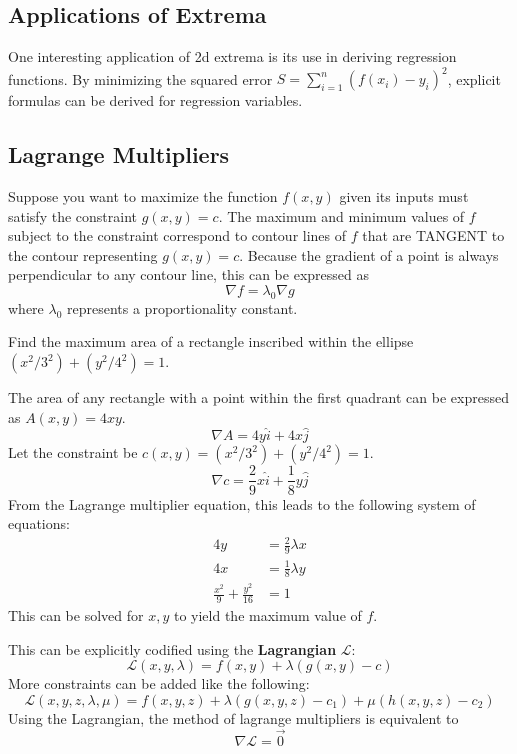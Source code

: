 \documentclass{article}
\begin{document}
\subsection{Applications of Extrema}
One interesting application of 2d extrema is its use in deriving regression functions.
By minimizing the squared error $S = \sum_{i=1}^{n} (f(x_i) - y_i)^2$, explicit formulas can be derived for regression variables.

\subsection{Lagrange Multipliers}
Suppose you want to maximize the function $f(x,y)$ given its inputs must satisfy the constraint $g(x,y) = c$.
The maximum and minimum values of $f$ subject to the constraint correspond to contour lines of $f$ that are TANGENT to the contour representing $g(x,y) = c$.
Because the gradient of a point is always perpendicular to any contour line, this can be expressed as
\[\nabla f = \lambda_0 \nabla g\]
where $\lambda_0$ represents a proportionality constant.

\begin{example}
    Find the maximum area of a rectangle inscribed within the ellipse $(x^2/3^2) + (y^2/4^2) = 1$.
\end{example}
\begin{answer}
    The area of any rectangle with a point within the first quadrant can be expressed as $A(x,y) = 4xy$.
    \[\nabla A = 4y\hat{i} + 4x \hat{j}\]
    Let the constraint be $c(x,y) = (x^2/3^2) + (y^2/4^2) = 1$.
    \[\nabla c = \frac{2}{9} x \hat{i} + \frac{1}{8} y \hat{j}\]
    From the Lagrange multiplier equation, this leads to the following system of equations:
    \begin{align*}
        4y &= \frac{2}{9} \lambda x \\
        4x &= \frac{1}{8} \lambda y \\
        \frac{x^2}{9} + \frac{y^2}{16} &= 1
    \end{align*}
    This can be solved for $x,y$ to yield the maximum value of $f$.
\end{answer}

This can be explicitly codified using the \textbf{Lagrangian} $\mathcal{L}$:
\[\mathcal{L}(x,y,\lambda) = f(x,y) + \lambda(g(x,y) - c)\]
More constraints can be added like the following:
\[\mathcal{L}(x,y,z,\lambda,\mu) = f(x,y,z) + \lambda(g(x,y,z) - c_1) + \mu (h(x,y,z) - c_2)\]
Using the Lagrangian, the method of lagrange multipliers is equivalent to
\[\nabla \mathcal{L} = \vec{0}\]
\end{document}
